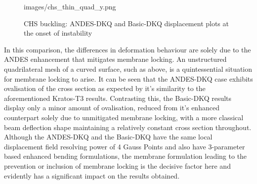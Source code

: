 \begin{figure}[H]
{	{images/chs_thin_quad_y.png}}
	\caption{\label{chs buckling pics2}CHS buckling: ANDES-DKQ and Basic-DKQ displacement plots at the onset of instability}
\end{figure}

In this comparison, the differences in deformation behaviour are solely due to the ANDES enhancement that mitigates membrane locking. An unstructured quadrilateral mesh of a curved surface, such as above, is a quintessential situation for membrane locking to arise. It can be seen that the ANDES-DKQ case exhibits ovalisation of the cross section as expected by it's similarity to the aforementioned Kratos-T3 results. Contrasting this, the Basic-DKQ results display only a minor amount of ovalisation, reduced from it's enhanced counterpart solely due to unmitigated membrane locking, with a more classical beam deflection shape maintaining a relatively constant cross section throughout. Although the ANDES-DKQ and the Basic-DKQ have the same local displacement field resolving power of 4 Gauss Points and also have 3-parameter based enhanced bending formulations, the membrane formulation leading to the prevention or inclusion of membrane locking is the decisive factor here and evidently has a significant impact on the results obtained.

